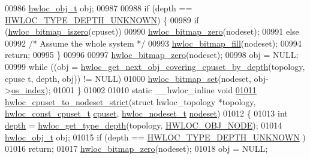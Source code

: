 \begin{DoxyCode}
00986         \hyperlink{a00016}{hwloc_obj_t} obj;
00987 
00988         \textcolor{keywordflow}{if} (depth == \hyperlink{a00046_ggaf4e663cf42bbe20756b849c6293ef575a0565ab92ab72cb0cec91e23003294aad}{HWLOC_TYPE_DEPTH_UNKNOWN}) \{
00989                  \textcolor{keywordflow}{if} (\hyperlink{a00065_gaa94fed35d2a598bc4a8657b6955b7bf5}{hwloc_bitmap_iszero}(cpuset))
00990                         \hyperlink{a00065_ga6c540b9fe63b8223b6aba46d56dd63b8}{hwloc_bitmap_zero}(nodeset);
00991                 \textcolor{keywordflow}{else}
00992                         \textcolor{comment}{/* Assume the whole system */}
00993                         \hyperlink{a00065_ga52456f7ef79d68e610cb65e3f7ffafad}{hwloc_bitmap_fill}(nodeset);
00994                 \textcolor{keywordflow}{return};
00995         \}
00996 
00997         \hyperlink{a00065_ga6c540b9fe63b8223b6aba46d56dd63b8}{hwloc_bitmap_zero}(nodeset);
00998         obj = NULL;
00999         \textcolor{keywordflow}{while} ((obj = \hyperlink{a00056_ga2f9a4ec15e9cfae8c21501257a51ce5b}{hwloc_get_next_obj_covering_cpuset_by_depth}(topology, cpuse
      t, depth, obj)) != NULL)
01000                 \hyperlink{a00065_ga497556af0cc34f109ae0277999c074d3}{hwloc_bitmap_set}(nodeset, obj->\hyperlink{a00016_a61a7a80a68eaccbaaa28269e678c81a9}{os_index});
01001 \}
01002 
01010 \textcolor{keyword}{static} \_\_hwloc\_inline \textcolor{keywordtype}{void}
\hypertarget{a00031_source_l01011}{}\hyperlink{a00062_ga9162785e39d7c697f76f99524c4a2fb4}{01011} \hyperlink{a00062_ga9162785e39d7c697f76f99524c4a2fb4}{hwloc_cpuset_to_nodeset_strict}(\textcolor{keyword}{struct} hwloc\_topology *topology, 
      \hyperlink{a00040_ga1f784433e9b606261f62d1134f6a3b25}{hwloc_const_cpuset_t} \hyperlink{a00016_a67925e0f2c47f50408fbdb9bddd0790f}{cpuset}, \hyperlink{a00040_ga37e35730fa7e775b5bb0afe893d6d508}{hwloc_nodeset_t} \hyperlink{a00016_a08f0d0e16c619a6e653526cbee4ffea3}{nodeset})
01012 \{
01013         \textcolor{keywordtype}{int} \hyperlink{a00016_a9d82690370275d42d652eccdea5d3ee5}{depth} = \hyperlink{a00046_gaea7c64dd59467f5201ba87712710b14d}{hwloc_get_type_depth}(topology, \hyperlink{a00041_ggacd37bb612667dc437d66bfb175a8dc55aaf0964881117bdedf1a5e9332cd120dd}{HWLOC_OBJ_NODE});
01014         \hyperlink{a00016}{hwloc_obj_t} obj;
01015         \textcolor{keywordflow}{if} (depth == \hyperlink{a00046_ggaf4e663cf42bbe20756b849c6293ef575a0565ab92ab72cb0cec91e23003294aad}{HWLOC_TYPE_DEPTH_UNKNOWN} )
01016                 \textcolor{keywordflow}{return};
01017         \hyperlink{a00065_ga6c540b9fe63b8223b6aba46d56dd63b8}{hwloc_bitmap_zero}(nodeset);
01018         obj = NULL;

\end{DoxyCode}
